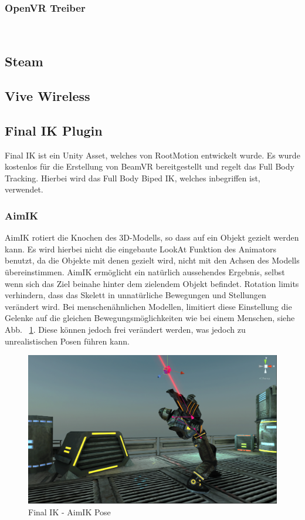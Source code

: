 \subsubsection{OpenVR Treiber}

~\cite{OpenVR_SteamWorks_Documentation_2020}


\subsection{Steam}\label{subsec:steam}

\subsection{Vive Wireless}

\subsection{Final IK Plugin}
Final IK ist ein Unity Asset, welches von RootMotion entwickelt wurde.
Es wurde kostenlos für die Erstellung von BeamVR bereitgestellt und regelt das Full Body Tracking.
Hierbei wird das Full Body Biped IK, welches inbegriffen ist, verwendet.
~\cite{FinalIK_Overview_2020}

\subsubsection{AimIK}
AimIK rotiert die Knochen des 3D-Modells, so dass auf ein Objekt gezielt werden kann.
Es wird hierbei nicht die eingebaute LookAt Funktion des Animators benutzt, da die Objekte mit denen gezielt wird, nicht mit den Achsen des Modells übereinstimmen.
AimIK ermöglicht ein natürlich aussehendes Ergebnis, selbst wenn sich das Ziel beinahe hinter dem zielendem Objekt befindet.
Rotation limits verhindern, dass das Skelett in unnatürliche Bewegungen und Stellungen verändert wird.
Bei menschenähnlichen Modellen, limitiert diese Einstellung die Gelenke auf die gleichen Bewegungsmöglichkeiten wie bei einem Menschen, siehe Abb. ~\ref{fig:finalIK_aimIK_pose}.
Diese können jedoch frei verändert werden, was jedoch zu unrealistischen Posen führen kann.
\begin {figure}
    \centering
    \includegraphics[scale=0.4]{pics/finalik_aimik_pose}
    \caption{Final IK - AimIK Pose}
    \label{fig:finalIK_aimIK_pose}
\end {figure}

